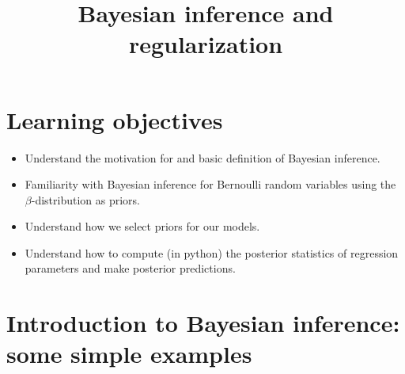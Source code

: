 




\title{Bayesian inference and regularization}
\maketitle


\section{Learning objectives}
\begin{itemize}
\item Understand the motivation for and basic definition of Bayesian inference. 
\item Familiarity with Bayesian inference for Bernoulli random variables using the $\beta$-distribution as priors. 
\item Understand how we select priors for our models. 
\item Understand how to compute (in python) the posterior statistics of regression parameters and make posterior predictions. 
\end{itemize}



\section{Introduction to Bayesian inference: some simple examples}


